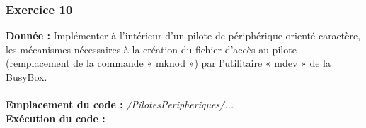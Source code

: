 \subsubsection{Exercice 10}
\textbf{Donnée : } Implémenter	à	l’intérieur	d’un	pilote	de	périphérique	orienté	caractère,	les	mécanismes	
nécessaires	à	la	création	du	fichier	d’accès	au	pilote	(remplacement	de	la	commande	« mknod »)	
par	l’utilitaire	« mdev »	de	la	BusyBox.\\\\
\textbf{Emplacement du code : } \textit{/PilotesPeripheriques/...}\\

\textbf{Exécution du code : } \\
\begin{lstlisting}

\end{lstlisting}








